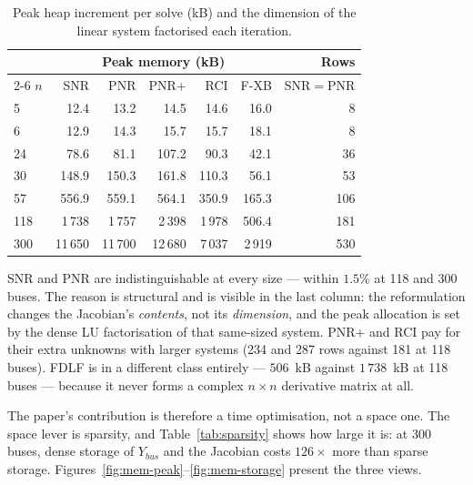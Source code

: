 \documentclass[sigconf,nonacm]{acmart}
\begin{document}
\begin{table}[t]
\centering
\caption{Peak heap increment per solve (kB) and the dimension of the linear
system factorised each iteration.}
\label{tab:memory}
\small
\begin{tabular}{l r r r r r r}
\toprule
& \multicolumn{5}{c}{Peak memory (kB)} & Rows \\
\cmidrule(lr){2-6}
$n$ & SNR & PNR & PNR+ & RCI & F-XB & SNR$=$PNR \\
\midrule
5   & 12.4     & 13.2     & 14.5     & 14.6    & 16.0  & 8 \\
6   & 12.9     & 14.3     & 15.7     & 15.7    & 18.1  & 8 \\
24  & 78.6     & 81.1     & 107.2    & 90.3    & 42.1  & 36 \\
30  & 148.9    & 150.3    & 161.8    & 110.3   & 56.1  & 53 \\
57  & 556.9    & 559.1    & 564.1    & 350.9   & 165.3 & 106 \\
118 & 1\,738   & 1\,757   & 2\,398   & 1\,978  & 506.4 & 181 \\
300 & 11\,650  & 11\,700  & 12\,680  & 7\,037  & 2\,919 & 530 \\
\bottomrule
\end{tabular}
\end{table}

SNR and PNR are indistinguishable at every size --- within $1.5\%$ at 118 and
300 buses. The reason is structural and is visible in the last column: the
reformulation changes the Jacobian's \emph{contents}, not its \emph{dimension},
and the peak allocation is set by the dense LU factorisation of that
same-sized system. PNR+ and RCI pay for their extra unknowns with larger systems
(234 and 287 rows against 181 at 118 buses). FDLF is in a different class
entirely --- $506$~kB against $1\,738$~kB at 118 buses --- because it never forms
a complex $n\times n$ derivative matrix at all.

The paper's contribution is therefore a time optimisation, not a space one. The
space lever is sparsity, and Table~\ref{tab:sparsity} shows how large it is: at
300 buses, dense storage of $Y_{bus}$ and the Jacobian costs $126\times$ more
than sparse storage. Figures~\ref{fig:mem-peak}--\ref{fig:mem-storage} present
the three views.
\end{document}

